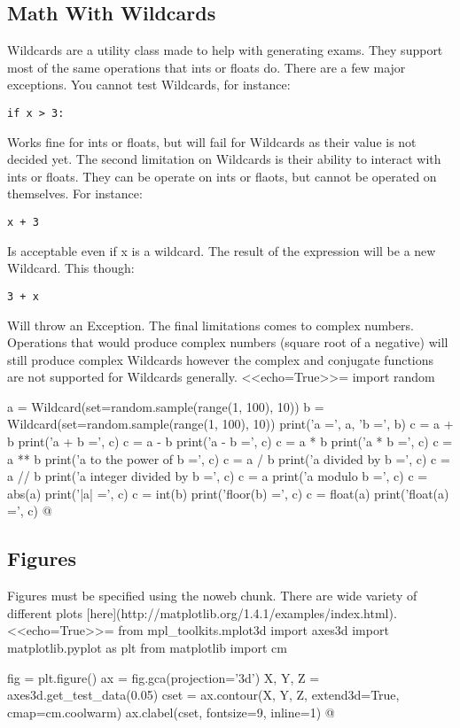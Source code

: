 \documentclass[12pt]{exam}
\begin{document}
\subsection*{Math With Wildcards}
Wildcards are a utility class made to help with generating exams. They support most of the same operations that ints or
floats do. There are a few major exceptions. You cannot test Wildcards, for instance:
\begin{verbatim}
if x > 3:
\end{verbatim}
Works fine for ints or floats, but will fail for Wildcards as their value is not decided yet. The second limitation on
Wildcards is their ability to interact with ints or floats. They can be operate on ints or flaots, but cannot be
operated on themselves. For instance:
\begin{verbatim}
x + 3
\end{verbatim}
Is acceptable even if x is a wildcard. The result of the expression will be a new Wildcard. This though:
\begin{verbatim}
3 + x
\end{verbatim}
Will throw an Exception. The final limitations comes to complex numbers. Operations that would produce complex numbers
(square root of a negative) will still produce complex Wildcards however the complex and conjugate functions are not
supported for Wildcards generally.
<<echo=True>>=
import random

a = Wildcard(set=random.sample(range(1, 100), 10))
b = Wildcard(set=random.sample(range(1, 100), 10))
print('a =', a, 'b =', b)
c = a + b
print('a + b =', c)
c = a - b
print('a - b =', c)
c = a * b
print('a * b =', c)
c = a ** b
print('a to the power of b =', c)
c = a / b
print('a divided by b =', c)
c = a // b
print('a integer divided by b =', c)
c = a %
print('a modulo b =', c)
c = abs(a)
print('|a| =', c)
c = int(b)
print('floor(b) =', c)
c = float(a)
print('float(a) =', c)
@

\subsection*{Figures}
Figures must be specified using the noweb chunk. There are wide variety of different plots
[here](http://matplotlib.org/1.4.1/examples/index.html).
<<echo=True>>=
from mpl_toolkits.mplot3d import axes3d
import matplotlib.pyplot as plt
from matplotlib import cm

fig = plt.figure()
ax = fig.gca(projection='3d')
X, Y, Z = axes3d.get_test_data(0.05)
cset = ax.contour(X, Y, Z, extend3d=True, cmap=cm.coolwarm)
ax.clabel(cset, fontsize=9, inline=1)
@
\end{document}
